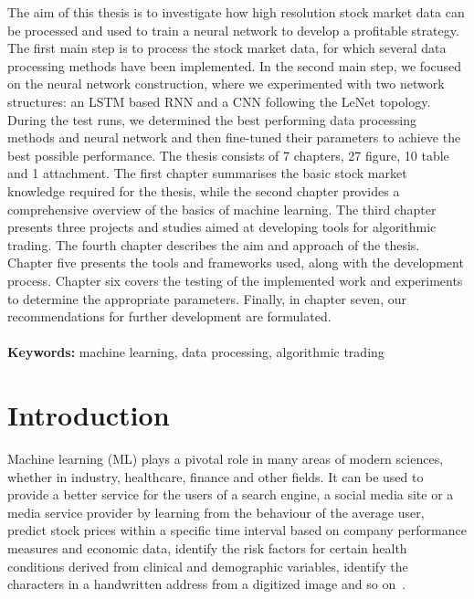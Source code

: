\documentclass[a4paper,oneside,onecolumn,12pt]{book}
\begin{document}
\thispagestyle{empty}
The aim of this thesis is to investigate how high resolution stock market data can be processed and used to train a neural network to develop a profitable strategy. The first main step is to process the stock market data, for which several data processing methods have been implemented. In the second main step, we focused on the neural network construction, where we experimented with two network structures: an LSTM based RNN and a CNN following the LeNet topology. During the test runs, we determined the best performing data processing methods and neural network and then fine-tuned their parameters to achieve the best possible performance. The thesis consists of 7 chapters, 27 figure, 10 table and 1 attachment. The first chapter summarises the basic stock market knowledge required for the thesis, while the second chapter provides a comprehensive overview of the basics of machine learning. The third chapter presents three projects and studies aimed at developing tools for algorithmic trading. The fourth chapter describes the aim and approach of the thesis. Chapter five presents the tools and frameworks used, along with the development process. Chapter six covers the testing of the implemented work and experiments to determine the appropriate parameters. Finally, in chapter seven, our recommendations for further development are formulated.
\\\\
\textbf{Keywords:} machine learning, data processing, algorithmic trading
\pagebreak

\tableofcontents
\thispagestyle{empty}

\listoffigures
\thispagestyle{empty}

\pagebreak
\section*{Introduction}
Machine learning (ML) plays a pivotal role in many areas of modern sciences, whether in industry, healthcare, finance and other fields. It can be used to provide a better service for the users of a search engine, a social media site or a media service provider by learning from the behaviour of the average user, predict stock prices within a specific time interval based on company performance measures and economic data, identify the risk factors for certain health conditions derived from clinical and demographic variables, identify the characters in a handwritten address from a digitized image and so on~\cite{TESL}.
\end{document}
